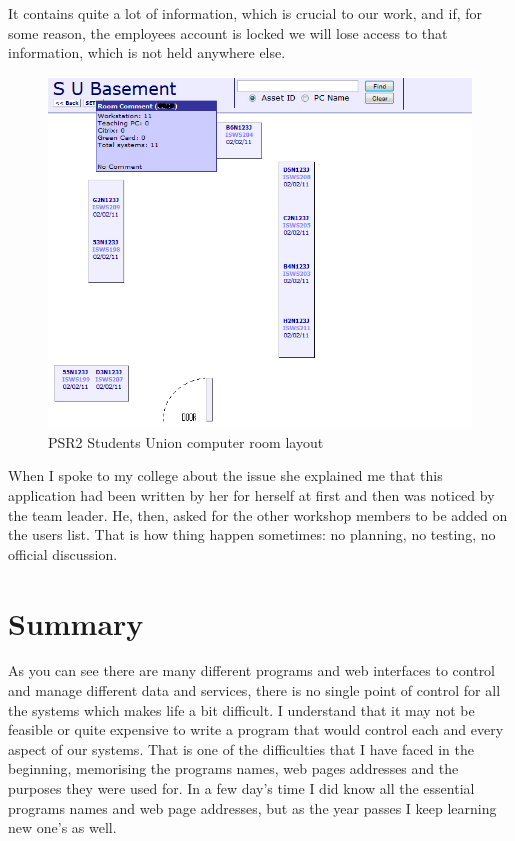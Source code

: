\documentclass[10pt,a4paper,headinclude=true,twoside]{report}
\begin{document}
It contains quite a lot of information, which is crucial to our work, and if, for some reason, the employees account is locked we will lose access to that information, which is not held anywhere else.

\begin{figure}[H]
\includegraphics[scale=0.5]{./PSR2_SU_Room_layout}
\caption{PSR2 Students Union computer room layout}
\label{fig:PSR2_SU_Room_layout}
\end{figure}

When I spoke to my college about the issue she explained me that this application had been written by her for herself at first and then was noticed by the team leader. He, then, asked for the other workshop members to be added on the users list. That is how thing happen sometimes: no planning, no testing, no official discussion.

\section{Summary}
As you can see there are many different programs and web interfaces to control and manage different data and services, there is no single point of control for all the systems which makes life a bit difficult. I understand that it may not be feasible or quite expensive to write a program that would control each and every aspect of our systems. That is one of the difficulties that I have faced in the beginning, memorising the programs names, web pages addresses and the purposes they were used for. In a few day's time I did know all the essential programs names and web page addresses, but as the year passes I keep learning new one's as well.   
\end{document}
